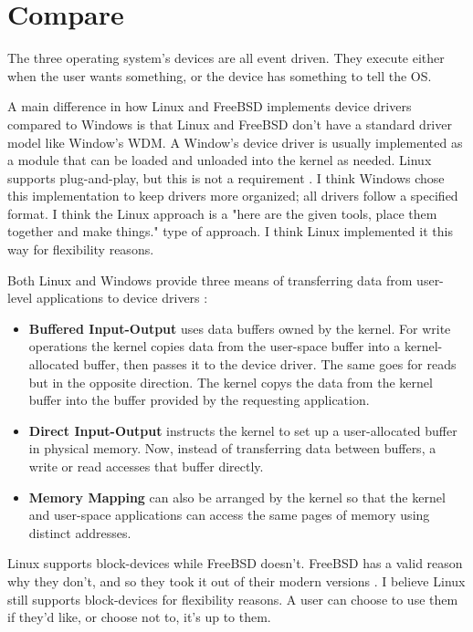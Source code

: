 \documentclass[onecolumn,draftclsnofoot, 10pt, compsoc]{IEEEtran}
\begin{document}
\section{Compare}
	The three operating system's devices are all event driven. 
	They execute either when the user wants something, or the device has something to tell the OS.
	
	A main difference in how Linux and FreeBSD implements device drivers compared to Windows is that Linux and FreeBSD don't have a standard driver model like Window's WDM. A Window's device driver is usually implemented as a module that can be loaded and unloaded into the kernel as needed. Linux supports plug-and-play, but this is not a requirement \cite{windowsDevs}. I think Windows chose this implementation to keep drivers more organized; all drivers follow a specified format. I think the Linux approach is a "here are the given tools, place them together and make things." type of approach. I think Linux implemented it this way for flexibility reasons. 
	
	Both Linux and Windows provide three means of transferring data from user-level applications to device drivers  \cite{windowsDevs}:
	\begin{itemize}
		\item \textbf{Buffered Input-Output} uses data buffers owned by the kernel. For write operations the kernel copies data from the user-space buffer into a kernel-allocated buffer, then passes it to the device driver. The same goes for reads but in the opposite direction. The kernel copys the data from the kernel buffer into the buffer provided by the requesting application.
		\item \textbf{Direct Input-Output} instructs the kernel to set up a user-allocated buffer in physical memory. Now, instead of transferring data between buffers, a write or read accesses that buffer directly.
		\item \textbf{Memory Mapping} can also be arranged by the kernel so that the kernel and user-space applications can access the same pages of memory using distinct addresses.
	\end{itemize}
	
	Linux supports block-devices while FreeBSD doesn't. 
	FreeBSD has a valid reason why they don't, and so they took it out of their modern versions \cite{freeBSDSmall}.
	I believe Linux still supports block-devices for flexibility reasons.
	A user can choose to use them if they'd like, or choose not to, it's up to them.
	
\end{document}
